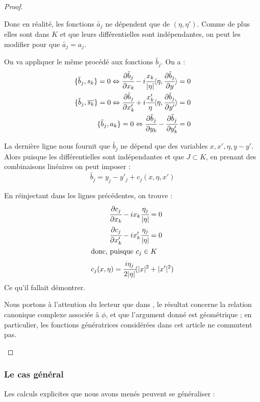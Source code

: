 \begin{proof}
\begin{enumerate}
\begin{itemize}
Donc en réalité, les fonctions $\tilde{a_j}$ ne dépendent que de $(\eta,\eta')$. Comme de plus elles sont dans $K$ et que leurs différentielles sont indépendantes, on peut les modifier pour que $\tilde{a_j}=a_j$.

On va appliquer le même procédé aux fonctions $\tilde{b_j}$. On a :
\begin{align*}
  \{\tilde{b}_j,s_k\}=0 \Leftrightarrow \cfrac{\partial \tilde{b}_j}{\partial x_k} - i \cfrac{x_k}{|\eta|}\langle \eta, \cfrac{\partial \tilde{b}_j}{\partial y} \rangle =0\\
  \{\tilde{b}_j,\overline{s_k}\}=0 \Leftrightarrow \cfrac{\partial \tilde{b}_j}{\partial x'_k} + i \cfrac{x'_k}{\eta}\langle \eta, \cfrac{\partial \tilde{b}_j}{\partial y'} \rangle =0\\
  \{\tilde{b}_j,a_k\}=0 \Leftrightarrow \cfrac{\partial \tilde{b}_j}{\partial y_k} - \cfrac{\partial \tilde{b}_j}{\partial y'_k} = 0
\end{align*}

La dernière ligne nous fournit que $\tilde{b_j}$ ne dépend que des variables $x,x',\eta,y-y'$. Alors puisque les différentielles sont indépendantes et que $J \subset K$, en prenant des combinaisons linéaires on peut imposer :
\begin{equation*}
  \tilde{b_j} = y_j-y'_j + c_j(x,\eta,x')
\end{equation*}

En réinjectant dans les lignes précédentes, on trouve :
\begin{align*}
  \cfrac{\partial c_j}{\partial x_k} - i x_k\cfrac{\eta_j}{|\eta|} &=0\\
  \cfrac{\partial c_j}{\partial x'_k} - i x'_k\cfrac{\eta_j}{|\eta|} &=0\\
  \intertext{donc, puisque $c_j \in K$}
  c_j(x,\eta) = \cfrac{i\eta_j}{2|\eta|}(|x|^2 &+ |x'|^2)
\end{align*}
Ce qu'il fallait démontrer.
\end{itemize}

Nous portons à l'attention du lecteur que dans \cite{BoutetdeMonvel1975}, le résultat concerne la relation canonique complexe associée à $\phi$, et que  l'argument donné est géométrique ; en particulier, les fonctions génératrices considérées dans cet article ne commutent pas.

\end{enumerate}
\end{proof}

\subsubsection{Le cas général}
Les calculs explicites que nous avons menés peuvent se généraliser :

